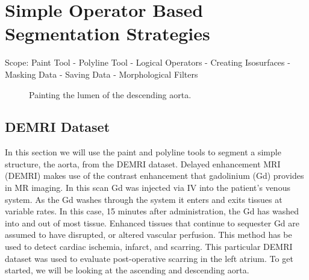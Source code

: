 \documentclass[fleqn,11pt,openany]{book}
\begin{document}
\chapter{Simple Operator Based Segmentation Strategies}

\begin{introduction}
Scope: Paint Tool - Polyline Tool - Logical Operators - Creating Isosurfaces - Masking Data - Saving Data - Morphological Filters
\end{introduction}

\begin{figure}
\caption{Painting the lumen of the descending aorta.}\label{fig:paintlumen}
\end{figure}

\section{DEMRI Dataset}

In this section we will use the paint and polyline tools to segment a simple structure, the aorta, from the DEMRI dataset.  Delayed enhancement MRI (DEMRI) makes use of the contrast enhancement that gadolinium (Gd) provides in MR imaging.  In this scan Gd was injected via IV into the patient's venous system.  As the Gd washes through the system it enters and exits tissues at variable rates.  In this case, 15 minutes after administration, the Gd has washed into and out of most tissue.  Enhanced tissues that continue to sequester Gd are assumed to have disrupted, or altered vascular perfusion.  This method has be used to detect cardiac ischemia, infarct, and scarring.  This particular DEMRI dataset was used to evaluate post-operative scarring in the left atrium.  To get started, we will be looking at the ascending and descending aorta.
\end{document}
